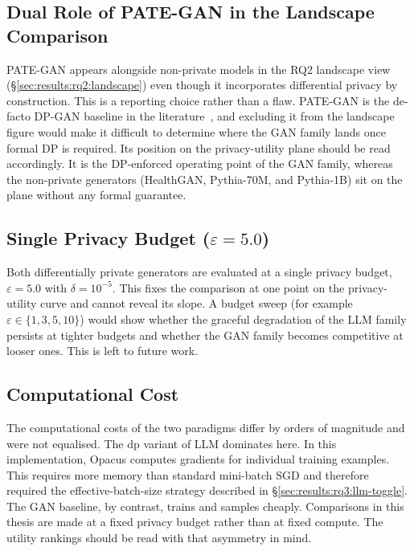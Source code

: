 \subsection{Dual Role of PATE-GAN in the Landscape Comparison}
\label{sec:discussion:limit:pategan-dual-role}

PATE-GAN appears alongside non-private models in the RQ2 landscape view
(\S\ref{sec:results:rq2:landscape}) even though it incorporates differential
privacy by construction. This is a reporting choice rather than a flaw.
PATE-GAN is the de-facto DP-GAN baseline in the literature~\cite{pategan},
and excluding it from the landscape figure would make it difficult to determine where the GAN
family lands once formal DP is required. Its position on the privacy-utility
plane should be read accordingly. It is the DP-enforced operating point of
the GAN family, whereas the non-private generators (HealthGAN, Pythia-70M,
and Pythia-1B) sit on the plane without any formal guarantee.

\subsection{Single Privacy Budget ($\varepsilon = 5.0$)}
\label{sec:discussion:limit:epsilon}

Both differentially private generators are evaluated at a single privacy
budget, $\varepsilon = 5.0$ with $\delta = 10^{-5}$. This fixes the
comparison at one point on the privacy-utility curve and cannot reveal its
slope. A budget sweep (for example $\varepsilon \in \{1, 3, 5, 10\}$) would
show whether the graceful degradation of the LLM family persists at tighter
budgets and whether the GAN family becomes competitive at looser ones. This
is left to future work.

\subsection{Computational Cost}
\label{sec:discussion:limit:compute}

The computational costs of the two paradigms differ by orders of magnitude
and were not equalised. The dp variant of LLM dominates here. In this implementation, Opacus computes gradients for individual
training examples. This requires more memory than standard mini-batch
SGD and therefore required the effective-batch-size strategy described
in \S\ref{sec:results:rq3:llm-toggle}. The GAN baseline, by contrast, trains
and samples cheaply. Comparisons in this thesis are made at a fixed privacy
budget rather than at fixed compute. The utility rankings should be read
with that asymmetry in mind.

